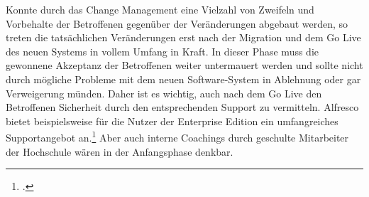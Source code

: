 Konnte durch das Change Management eine Vielzahl von Zweifeln und Vorbehalte der Betroffenen gegenüber der Veränderungen abgebaut werden, so treten die tatsächlichen Veränderungen erst nach der Migration und dem Go Live des neuen Systems in vollem Umfang in Kraft. In dieser Phase muss die gewonnene Akzeptanz der Betroffenen weiter untermauert werden und sollte nicht durch mögliche Probleme mit dem neuen Software-System in Ablehnung oder gar Verweigerung münden. Daher ist es wichtig, auch nach dem Go Live den Betroffenen Sicherheit durch den entsprechenden Support zu vermitteln. Alfresco bietet beispielsweise für die Nutzer der Enterprise Edition ein umfangreiches Supportangebot an.\footcite[Vgl.][]{alfresco_kundensupport_2015} Aber auch interne Coachings durch geschulte Mitarbeiter der Hochschule wären in der Anfangsphase denkbar. 